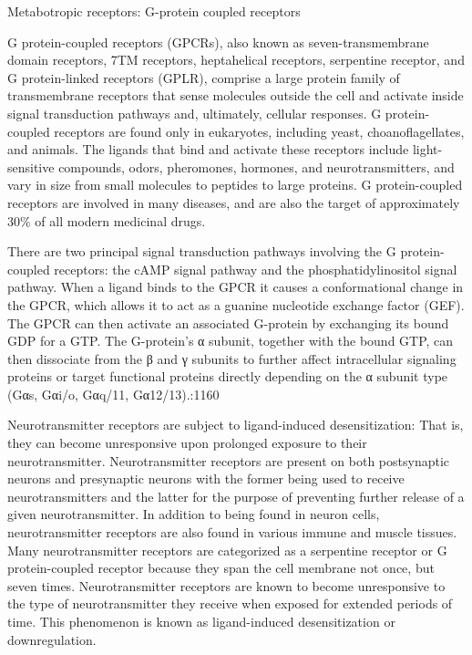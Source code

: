 \documentclass[]{book}
\begin{document}
Metabotropic receptors: G-protein coupled receptors

G protein-coupled receptors (GPCRs), also known as seven-transmembrane domain receptors, 7TM receptors, heptahelical receptors, serpentine receptor, and G protein-linked receptors (GPLR), comprise a large protein family of transmembrane receptors that sense molecules outside the cell and activate inside signal transduction pathways and, ultimately, cellular responses. G protein-coupled receptors are found only in eukaryotes, including yeast, choanoflagellates, and animals. The ligands that bind and activate these receptors include light-sensitive compounds, odors, pheromones, hormones, and neurotransmitters, and vary in size from small molecules to peptides to large proteins. G protein-coupled receptors are involved in many diseases, and are also the target of approximately 30\% of all modern medicinal drugs.

There are two principal signal transduction pathways involving the G protein-coupled receptors: the cAMP signal pathway and the phosphatidylinositol signal pathway. When a ligand binds to the GPCR it causes a conformational change in the GPCR, which allows it to act as a guanine nucleotide exchange factor (GEF). The GPCR can then activate an associated G-protein by exchanging its bound GDP for a GTP. The G-protein's α subunit, together with the bound GTP, can then dissociate from the β and γ subunits to further affect intracellular signaling proteins or target functional proteins directly depending on the α subunit type (Gαs, Gαi/o, Gαq/11, Gα12/13).:1160

Neurotransmitter receptors are subject to ligand-induced desensitization: That is, they can become unresponsive upon prolonged exposure to their neurotransmitter. Neurotransmitter receptors are present on both postsynaptic neurons and presynaptic neurons with the former being used to receive neurotransmitters and the latter for the purpose of preventing further release of a given neurotransmitter. In addition to being found in neuron cells, neurotransmitter receptors are also found in various immune and muscle tissues. Many neurotransmitter receptors are categorized as a serpentine receptor or G protein-coupled receptor because they span the cell membrane not once, but seven times. Neurotransmitter receptors are known to become unresponsive to the type of neurotransmitter they receive when exposed for extended periods of time. This phenomenon is known as ligand-induced desensitization or downregulation.
\end{document}
